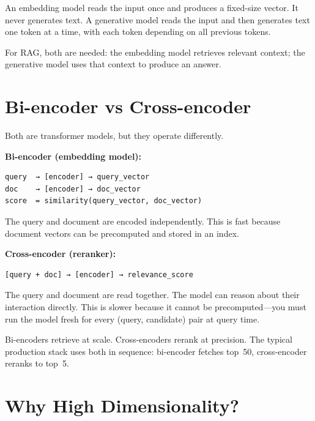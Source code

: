 An embedding model reads the input once and produces a fixed-size vector. It never generates
text. A generative model reads the input and then generates text one token at a time, with
each token depending on all previous tokens.

For RAG, both are needed: the embedding model retrieves relevant context; the generative model
uses that context to produce an answer.

\section{Bi-encoder vs Cross-encoder}

Both are transformer models, but they operate differently.

\textbf{Bi-encoder (embedding model):}

\begin{Verbatim}
query  → [encoder] → query_vector
doc    → [encoder] → doc_vector
score  = similarity(query_vector, doc_vector)
\end{Verbatim}

The query and document are encoded independently. This is fast because document vectors can
be precomputed and stored in an index.

\textbf{Cross-encoder (reranker):}

\begin{Verbatim}
[query + doc] → [encoder] → relevance_score
\end{Verbatim}

The query and document are read together. The model can reason about their interaction
directly. This is slower because it cannot be precomputed---you must run the model fresh for
every (query, candidate) pair at query time.

Bi-encoders retrieve at scale. Cross-encoders rerank at precision. The typical production
stack uses both in sequence: bi-encoder fetches top~50, cross-encoder reranks to top~5.

\section{Why High Dimensionality?}

